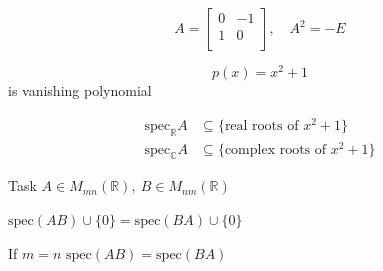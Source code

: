 \documentclass[fullscreen=true, bookmarks=true, hyperref={pdfencoding=unicode}]{beamer}
\begin{document}
\begin{frame}
  \begin{example}
    $$A = \begin{bmatrix}
      0 & -1 \\
      1 &  0 \\
    \end{bmatrix}, \quad A^2 = -E
    $$
  
    $$p(x) = x^2 + 1$$
    is vanishing polynomial

    \begin{align*}
      \mathrm{spec}_{\mathbb{R}} A &\subseteq \{\text{real roots of } x^2+1 \}\\
      \mathrm{spec}_{\mathbb{C}} A &\subseteq \{\text{complex roots of } x^2+1 \}
    \end{align*}
  \end{example}
\end{frame}
  

\begin{frame}
  \begin{block}{Task}
    $A \in M_{mn}(\mathbb{R}),\ B \in M_{nm}(\mathbb{R})$

    $\mathrm{spec}(AB) \cup \{0\} = \mathrm{spec}(BA) \cup \{0\}$

    If $m=n$ $\mathrm{spec}(AB) = \mathrm{spec}(BA)$
  \end{block}
\end{frame}
\end{document}
